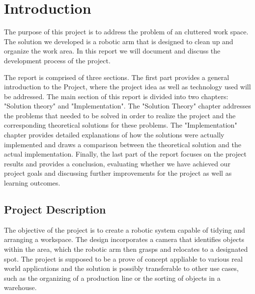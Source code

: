 
\chapter{Introduction} %
\label{CH1} %
The purpose of this project is to address the problem of an cluttered work space.
The solution we developed is a robotic arm that is designed to clean up and organize the work area. 
In this report we will document and discuss the development process of the project. 

The report is comprised of three sections. The first part provides a general introduction to the Project, where the project idea as well as technology used will be addressed. The main section of this report is divided into two chapters: "Solution theory" and "Implementation".
The "Solution Theory" chapter addresses the problems that needed to be solved in order to realize the project and the corresponding theoretical solutions for these problems. 
The "Implementation" chapter provides detailed explanations of how the solutions were actually implemented and draws a comparison between the theoretical solution and the actual implementation. Finally, the last part of the report focuses on the project results and provides a conclusion, evaluating whether we have achieved our project goals and discussing further improvements for the project as well as learning outcomes. 

\section{Project Description}

The objective of the project is to create a robotic system capable of tidying and arranging a workspace. The design incorporates a camera that identifies objects within the area, which the robotic arm then grasps and relocates to a designated spot. The project is supposed to be a prove of concept appliable to various real world applications and the solution is possibly transferable to other use cases, such as the organizing of a production line or the sorting of objects in a warehouse.


